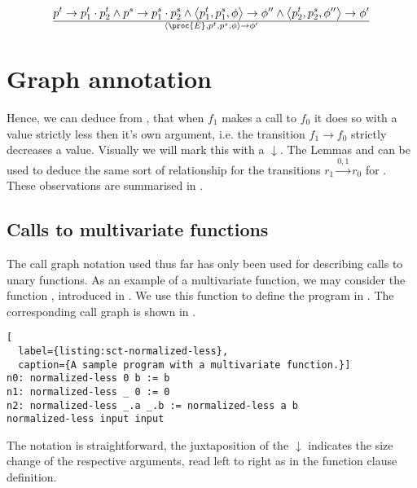 \begin{equation}
{
    p^t\rightarrow p^t_1\cdot p^t_2
  \wedge
    p^s\rightarrow p^s_1\cdot p^s_2
  \wedge
    \left\langle p^t_1, p^s_1, \phi\right\rangle
    \rightarrow
    \phi''
  \wedge
    \left\langle p^t_2, p^s_2, \phi''\right\rangle
    \rightarrow
    \phi'
}\over{
  \left\langle\proc{E},p^t,p^s,\phi\right\rangle
  \rightarrow
  \phi'
}
\end{equation}

\section{Graph annotation}

Hence, we can deduce from , that when $f_1$ makes a
call to $f_0$ it does so with a value strictly less then it's own argument,
i.e. the transition $f_1\rightarrow f_0$ strictly decreases a value. Visually
we will mark this with a $\downarrow$. The Lemmas 
and  can be used to deduce the same sort of
relationship for the transitions $r_1\xrightarrow{0,1} r_0$ for
. These observations are summarised in
.



\subsection{Calls to multivariate functions}

The call graph notation used thus far has only been used for describing calls
to unary functions. As an example of a multivariate function, we may consider
the function , introduced in
. We use this function to define the program in
. The corresponding call graph is shown in
.

\begin{lstlisting}[
  label={listing:sct-normalized-less},
  caption={A sample program with a multivariate function.}]
n0: normalized-less 0 b := b
n1: normalized-less _ 0 := 0
n2: normalized-less _.a _.b := normalized-less a b
normalized-less input input
\end{lstlisting}



The notation is straightforward, the juxtaposition of the $\downarrow$
indicates the size change of the respective arguments, read left to right as in
the function clause definition.

